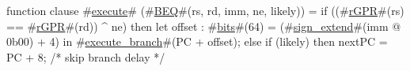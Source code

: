 function clause #\hyperref[zexecute]{execute}# (#\hyperref[zBEQ]{BEQ}#(rs, rd, imm, ne, likely)) =
  {
    if ((#\hyperref[zrGPR]{rGPR}#(rs) == #\hyperref[zrGPR]{rGPR}#(rd)) ^ ne) then
      {
        let offset : #\hyperref[zbits]{bits}#(64) = (#\hyperref[zsignzyextend]{sign\_extend}#(imm @ 0b00) + 4) in
        #\hyperref[zexecutezybranch]{execute\_branch}#(PC + offset);
      }
    else
      {
        if (likely) then
          nextPC = PC + 8; /* skip branch delay */
      }
  }
